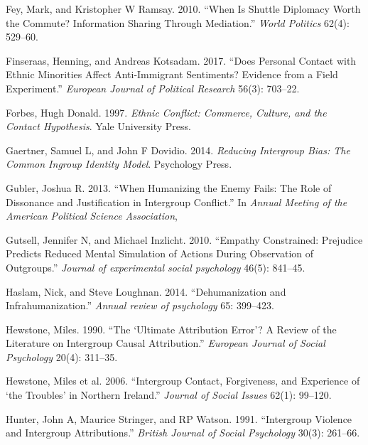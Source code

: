 \documentclass[11pt]{article}
\begin{document}
\leavevmode\hypertarget{ref-fey2010shuttle}{}%
Fey, Mark, and Kristopher W Ramsay. 2010. ``When Is Shuttle Diplomacy
Worth the Commute? Information Sharing Through Mediation.'' \emph{World
Politics} 62(4): 529--60.

\leavevmode\hypertarget{ref-finseraas2017does}{}%
Finseraas, Henning, and Andreas Kotsadam. 2017. ``Does Personal Contact
with Ethnic Minorities Affect Anti-Immigrant Sentiments? Evidence from a
Field Experiment.'' \emph{European Journal of Political Research} 56(3):
703--22.

\leavevmode\hypertarget{ref-forbes1997ethnic}{}%
Forbes, Hugh Donald. 1997. \emph{Ethnic Conflict: Commerce, Culture, and
the Contact Hypothesis}. Yale University Press.

\leavevmode\hypertarget{ref-gaertner2014reducing}{}%
Gaertner, Samuel L, and John F Dovidio. 2014. \emph{Reducing Intergroup
Bias: The Common Ingroup Identity Model}. Psychology Press.

\leavevmode\hypertarget{ref-gubler2013humanizing}{}%
Gubler, Joshua R. 2013. ``When Humanizing the Enemy Fails: The Role of
Dissonance and Justification in Intergroup Conflict.'' In \emph{Annual
Meeting of the American Political Science Association},

\leavevmode\hypertarget{ref-gutsell2010empathy}{}%
Gutsell, Jennifer N, and Michael Inzlicht. 2010. ``Empathy Constrained:
Prejudice Predicts Reduced Mental Simulation of Actions During
Observation of Outgroups.'' \emph{Journal of experimental social
psychology} 46(5): 841--45.

\leavevmode\hypertarget{ref-haslam2014dehumanization}{}%
Haslam, Nick, and Steve Loughnan. 2014. ``Dehumanization and
Infrahumanization.'' \emph{Annual review of psychology} 65: 399--423.

\leavevmode\hypertarget{ref-hewstone1990ultimate}{}%
Hewstone, Miles. 1990. ``The `Ultimate Attribution Error'? A Review of
the Literature on Intergroup Causal Attribution.'' \emph{European
Journal of Social Psychology} 20(4): 311--35.

\leavevmode\hypertarget{ref-hewstone2006intergroup}{}%
Hewstone, Miles et al. 2006. ``Intergroup Contact, Forgiveness, and
Experience of `the Troubles' in Northern Ireland.'' \emph{Journal of
Social Issues} 62(1): 99--120.

\leavevmode\hypertarget{ref-hunter1991intergroup}{}%
Hunter, John A, Maurice Stringer, and RP Watson. 1991. ``Intergroup
Violence and Intergroup Attributions.'' \emph{British Journal of Social
Psychology} 30(3): 261--66.
\end{document}
